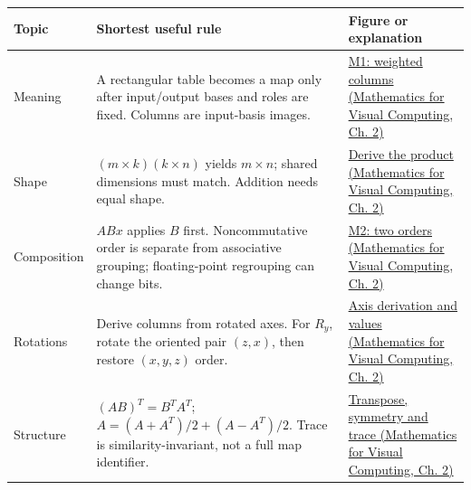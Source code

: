 {\def\LTcaptype{none} %
\begin{longtable}[]{@{}
  >{\raggedright\arraybackslash}p{}
  >{\raggedright\arraybackslash}p{}
  >{\raggedright\arraybackslash}p{}@{}}
\toprule\noalign{}
\begin{minipage}[b]{\linewidth}\raggedright
Topic
\end{minipage} & \begin{minipage}[b]{\linewidth}\raggedright
Shortest useful rule
\end{minipage} & \begin{minipage}[b]{\linewidth}\raggedright
Figure or explanation
\end{minipage} \\
\midrule\noalign{}
\endhead
\bottomrule\noalign{}
\endlastfoot
Meaning & A rectangular table becomes a map only after input/output bases and roles are fixed. Columns are input-basis images. & \href{../02-Mathematics-for-Visual-Computing/main.pdf\#nameddest=01-foundations-i-ch018-figure-m1---coordinates-weight-the-new-basis-directions}{M1: weighted columns (Mathematics for Visual Computing, Ch. 2)} \\
Shape & \((m\times k)(k\times n)\) yields \(m\times n\); shared dimensions must match. Addition needs equal shape. & \href{../02-Mathematics-for-Visual-Computing/main.pdf\#nameddest=01-foundations-i-ch018-combining-rules-explains-the-multiplication-law}{Derive the product (Mathematics for Visual Computing, Ch. 2)} \\
Composition & \(ABx\) applies \(B\) first. Noncommutative order is separate from associative grouping; floating-point regrouping can change bits. & \href{../02-Mathematics-for-Visual-Computing/main.pdf\#nameddest=01-foundations-i-ch018-figure-m2---the-same-operations-give-different-results-in-different-orders}{M2: two orders (Mathematics for Visual Computing, Ch. 2)} \\
Rotations & Derive columns from rotated axes. For \(R_y\), rotate the oriented pair \((z,x)\), then restore \((x,y,z)\) order. & \href{../02-Mathematics-for-Visual-Computing/main.pdf\#nameddest=01-foundations-i-ch018-the-oriented-plane-explains-the-y-rotation-signs}{Axis derivation and values (Mathematics for Visual Computing, Ch. 2)} \\
Structure & \((AB)^T=B^TA^T\); \(A=(A+A^T)/2+(A-A^T)/2\). Trace is similarity-invariant, not a full map identifier. & \href{../02-Mathematics-for-Visual-Computing/main.pdf\#nameddest=01-foundations-i-ch018-transpose-lets-us-compare-measurements-and-structure}{Transpose, symmetry and trace (Mathematics for Visual Computing, Ch. 2)} \\

\end{longtable}}
